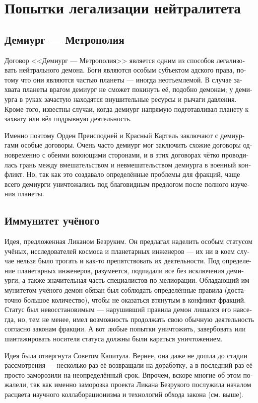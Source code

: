 \documentclass[a4paper,12pt,fleqn]{book}\usepackage{cooltooltips}\usepackage{polyglossia}\setdefaultlanguage[babelshorthands=true]{russian}\setotherlanguage{english}\defaultfontfeatures{Ligatures=TeX,Mapping=tex-text} \usepackage{xcolor}\definecolor{lightgray}{HTML}{bbbbbb}\color{lightgray}\newcommand{\ml}[3]{\textenglish{\textcolor{black}{#3}}}
\begin{document}
{\section{Попытки легализации нейтралитета}

\subsection{Демиург --- Метрополия}

Договор <<Демиург --- Метрополия>> является одним из способов легализовать нейтрального демона.
Боги являются особым субъектом адского права, потому что они являются частью планеты --- иногда неотъемлемой.
В случае захвата планеты врагом демиург не сможет покинуть её, подобно демонам;
у демиурга в руках зачастую находятся внушительные ресурсы и рычаги давления.
Кроме того, известны случаи, когда демиург напрямую подготавливал планету к захвату или вёл подрывную деятельность.

Именно поэтому Орден Преисподней и Красный Картель заключают с демиургами особые договоры.
Очень часто демиург мог заключить схожие договоры одновременно с обеими воюющими сторонами, и в этих договорах чётко проводилась грань между вмешательством и невмешательством демиурга в военный конфликт.
Но, так как это создавало определённые проблемы для фракций, чаще всего демиурги уничтожались под благовидным предлогом после полного изучения планеты.

\subsection{Иммунитет учёного}

Идея, предложенная Ликаном Безруким.
Он предлагал наделить особым статусом учёных, исследователей космоса и планетарных инженеров --- их ни в коем случае нельзя было трогать и как-то препятствовать их деятельности.
Под определение планетарных инженеров, разумеется, подпадали все без исключения демиурги, а также значительная часть специалистов по мелиорации.
Обладающий иммунитетом учёного демон обязан был соблюдать определённые правила (достаточно большое количество), чтобы не оказаться втянутым в конфликт фракций.
Статус был невосстановимым --- нарушивший правила демон лишался его навсегда, но, тем не менее, имел возможность продолжать свою обычную деятельность согласно законам фракции.
А вот любые попытки уничтожить, завербовать или шантажировать носителя статуса должны были караться уничтожением.

Идея была отвергнута Советом Капитула.
Вернее, она даже не дошла до стадии рассмотрения --- несколько раз её возвращали на доработку, а в последний раз её просто заморозили на неопределённый срок.
Впрочем, вскоре многие об этом пожалели, так как именно заморозка проекта Ликана Безрукого послужила началом расцвета научного коллаборационизма и технологий обхода закона (см. выше).

}
\end{document}
